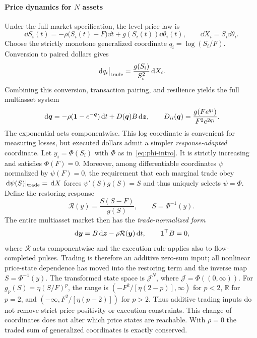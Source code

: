 \documentclass[review,hidelinks,onefignum,onetabnum]{siamonline250211}
\begin{document}
\paragraph{Price dynamics for $N$ assets} Under the full market specification, the level-price law is
\begin{equation}\label{eq:level-dynamics}
\dd S_i(t)=-\rho\big(S_i(t)-F\big)\dd t+g(S_i(t))\dd\theta_i(t),\qquad \dd X_i=S_i\dd\theta_i.
\end{equation}
Choose the strictly monotone generalized coordinate $q_i=\log(S_i/F)$. Conversion to paired dollars gives
\begin{equation}\label{eq:log-impact}
\,\mathrm{d} q_i\big|_{\rm trade}=\frac{g(S_i)}{S_i^2}\,\mathrm{d} X_i.
\end{equation}
Combining this conversion, transaction pairing, and resilience yields the full multiasset system
\begin{equation}\label{eq:master}
\,\mathrm{d}\bm q=-\rho(\mathbf{1}-e^{-\bm q})\,\mathrm{d} t+D(\bm q)B\,\mathrm{d}\bm z,\qquad
D_{ii}(\bm q)=\frac{g(Fe^{q_i})}{F^2e^{2q_i}}.
\end{equation}
The exponential acts componentwise. This log coordinate is convenient for measuring losses, but executed dollars admit a simpler \emph{response-adapted} coordinate. Let $y_i=\Phi(S_i)$ with $\Phi$ as in~\eqref{eq:phi-intro}. It is strictly increasing and satisfies $\Phi(F)=0$. Moreover, among differentiable coordinates $\psi$ normalized by $\psi(F)=0$, the requirement that each marginal trade obey $\,\mathrm{d}\psi(S)|_{\rm trade}=\,\mathrm{d} X$ forces $\psi'(S)g(S)=S$ and thus uniquely selects $\psi=\Phi$. Define the restoring response
\[
\mathcal R(y)=\frac{S(S-F)}{g(S)},\qquad S=\Phi^{-1}(y).
\]
The entire multiasset market then has the \emph{trade-normalized form}
\begin{equation}\label{eq:normal-form}
\,\mathrm{d}\bm y=B\,\mathrm{d}\bm z-\rho\mathcal R(\bm y)\,\mathrm{d} t,\qquad\mathbf{1}^\top B=0,
\end{equation}
where $\mathcal R$ acts componentwise and the execution rule applies also to flow-completed pulses. Trading is therefore an additive zero-sum input; all nonlinear price-state dependence has moved into the restoring term and the inverse map $S=\Phi^{-1}(y)$. The transformed state space is $\mathcal J^N$, where $\mathcal J=\Phi((0,\infty))$. For $g_p(S)=\eta(S/F)^p$, the range is $(-F^2/[\eta(2-p)],\infty)$ for $p<2$, $\mathbb R$ for $p=2$, and $(-\infty,F^2/[\eta(p-2)])$ for $p>2$. Thus additive trading inputs do not remove strict price positivity or execution constraints. This change of coordinates does not alter which price states are reachable. With $\rho=0$ the traded sum of generalized coordinates is exactly conserved.
\end{document}
